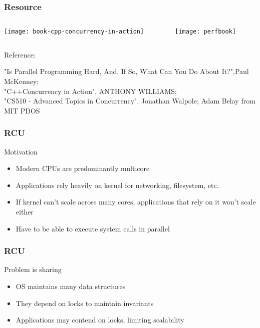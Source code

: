 \begin{frame}
    \frametitle{Resource}
    
    
    

	\begin{columns}
    
    \begin{column}{.5\textwidth}
        \centering
        
        \texttt{[image: book-cpp-concurrency-in-action]}
        
    \end{column}
    
    \begin{column}{.5\textwidth}
        
      \texttt{[image: perfbook]}
       
        
    \end{column}
    
    
\end{columns}
    
    \tiny Reference:
    
    "Is Parallel Programming Hard, And, If So, What Can You Do About It?",Paul McKenney;\\
    "C++Concurrency in Action", ANTHONY WILLIAMS; \\
    "CS510 - Advanced Topics in Concurrency", Jonathan Walpole;
    Adam Belay from MIT PDOS
    
\end{frame}

\begin{frame}[fragile]
    \frametitle{RCU}
    \Large
    Motivation
    \begin{itemize}
    \item Modern CPUs are predominantly multicore
    \item Applications rely heavily on kernel for networking,
    filesystem, etc.
    \item If kernel can’t scale across many cores, applications
    that rely on it won’t scale either
    \item Have to be able to execute system calls in parallel
\end{itemize}
\end{frame}
\begin{frame}[fragile]
    \frametitle{RCU}
    \Large
    Problem is sharing
    \begin{itemize}
        \item OS maintains many data structures
        \item They depend on locks to maintain invariants
        \item Applications may contend on locks, limiting
        scalability
        
    \end{itemize}
    
\end{frame}


